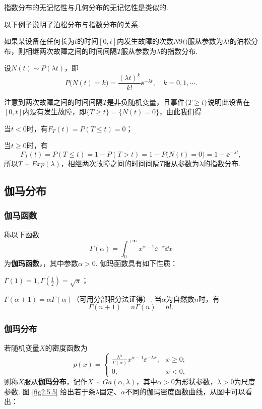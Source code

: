 指数分布的无记忆性与几何分布的无记忆性是类似的.

以下例子说明了泊松分布与指数分布的关系.

\begin{example}
  如果某设备在任何长为$t$的时间$[0,t]$内发生故障的次数$N9t)$服从参数为$\lambda t$的泊松分布，则相继两次故障之间的时间间隔$T$服从参数为$\lambda$的指数分布.
\end{example}

\begin{solution}
  设$N(t)\sim P(\lambda t)$，即
  \[
    P\big( N(t) = k \big) = \frac{(\lambda t)^k}{k!} \ee^{-\lambda t},\quad k=0,1,\cdots.
  \]

  注意到两次故障之间的时间间隔$T$是非负随机变量，且事件$\{T\ge t\}$说明此设备在$[0,t]$内没有发生故障，即$\{T\ge t\}=\{N(t)=0\}$，由此我们得

  当$t<0$时，有$F_T(t)=P(T\le t)=0$；

  当$t\ge0$时，有
  \[
    F_T(t) = P(T\le t) = 1 - P(T>t) = 1 -P\big( N(t)=0 \big) = 1 - \ee^{-\lambda t},
  \]
  所以$T\sim Exp(\lambda)$，相继两次故障之间的时间间隔$T$服从参数为$\lambda$的指数分布.
\end{solution}

\subsection{伽马分布}
\subsubsection{伽马函数}
称以下函数
\begin{equation}\label{eq2.5.11}
  \Gamma(\alpha) = \int_0^{+\infty}x^{\alpha-1}\ee^{-x} \dd x
\end{equation}
为\textbf{伽玛函数}，，其中参数$\alpha>0$. 伽玛函数具有如下性质：

\begin{inparaenum}[(1)]
  \item $\Gamma(1)=1,\Gamma\left(\frac12\right)=\sqrt\pi$；

  \item $\Gamma(\alpha+1)=\alpha\Gamma(\alpha)$（可用分部积分法证得）. 当$\alpha$为自然数$n$时，有
      \[
        \Gamma(n+1) = n\Gamma(n) = n!.
      \]
\end{inparaenum}

\subsubsection{伽玛分布}
若随机变量$X$的密度函数为
\begin{equation}\label{eq2.5.12}
  p(x) = \begin{cases}
    \frac{\lambda^\alpha}{\Gamma(\alpha)}x^{\alpha-1}
    \ee^{-\lambda x}, & x\ge 0 ; \\
    0, & x < 0,
  \end{cases}
\end{equation}
则称$X$服从\textbf{伽玛分布}，记作$X\sim Ga(\alpha,\lambda)$，其中$\alpha>0$为形状参数，$\lambda>0$为尺度参数. 图 \ref{fig2.5.5} 给出若于条$\lambda$固定、$\alpha$不同的伽玛密度函数曲线，从图中可以看出：


